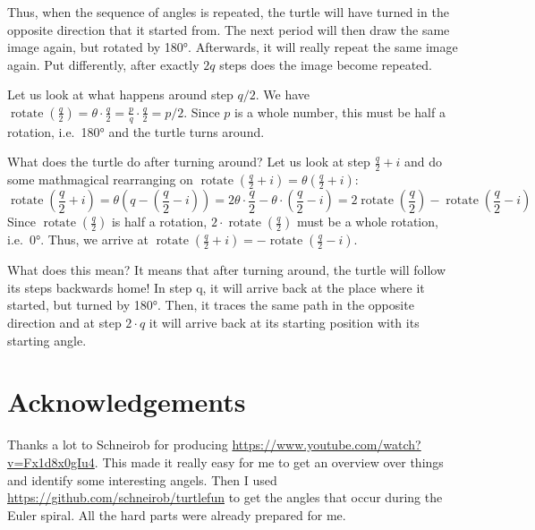 \documentclass[pdftex,a4paper]{scrartcl}
\DeclareMathOperator{\rotate}{rotate}
\begin{document}
Thus, when the sequence of angles is repeated, the turtle will have turned in the opposite direction that it started
from. The next period will then draw
the same image again, but rotated by 180°. Afterwards, it will really repeat the same image again. Put differently,
after exactly \(2q\) steps does the image become repeated.

Let us look at what happens around step \(q/2\). We have \(\rotate(\frac{q}{2})=\theta\cdot \frac{q}{2}
= \frac{p}{q} \cdot \frac{q}{2} = p/2\). Since \(p\) is a whole number, this must be half a rotation, i.e.\ 180° and the
turtle turns around.

What does the turtle do after turning around? Let us look at step \(\frac{q}{2}+i\) and do some mathmagical rearranging
on
\(
\rotate\left(\frac{q}{2}+i\right)
=\theta\left(\frac{q}{2}+i\right)
\):
\[
\rotate\left(\frac{q}{2}+i\right)
=\theta\left(q-\left(\frac{q}{2}-i\right)\right)
=2\theta\cdot \frac{q}{2} - \theta\cdot\left(\frac{q}{2}-i\right)
=2\rotate\left(\frac{q}{2}\right)-\rotate\left(\frac{q}{2}-i\right)
\]
Since \(\rotate(\frac{q}{2})\) is half a rotation, \(2\cdot\rotate(\frac{q}{2})\) must be a whole rotation, i.e.\ 0°. Thus,
we arrive at \(\rotate(\frac{q}{2}+i)=-\rotate(\frac{q}{2}-i)\).

What does this mean? It means that after turning around, the turtle will follow its steps backwards home! In step
q, it will arrive back at the place where it started, but turned by 180°. Then, it traces the same path in the opposite
direction and at step \(2\cdot q\) it will arrive back at its starting position with its starting angle.

\section{Acknowledgements}
Thanks a lot to Schneirob for producing \url{https://www.youtube.com/watch?v=Fx1d8x0gIu4}. This made it really easy for
me to get an overview over things and identify some interesting angels. Then I used
\url{https://github.com/schneirob/turtlefun} to get the angles that occur during the Euler spiral. All the hard parts
were already prepared for me.
\end{document}
